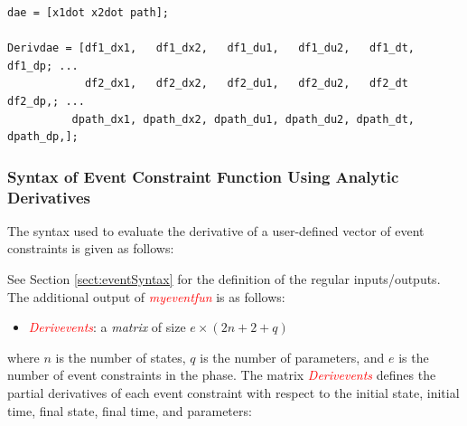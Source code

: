 \documentclass[10pt]{article}
\newenvironment{shadedframe}{%
  \def\FrameCommand{\fcolorbox{black}{shadecolor}}%
  \MakeFramed {\FrameRestore}}
{\endMakeFramed}
\newcommand{\slred}[1]{\textcolor{red}{\sl #1}}
\begin{document}
\begin{shadedframe}
\begin{verbatim}
dae = [x1dot x2dot path];

Derivdae = [df1_dx1,   df1_dx2,   df1_du1,   df1_du2,   df1_dt,   df1_dp; ...
            df2_dx1,   df2_dx2,   df2_du1,   df2_du2,   df2_dt    df2_dp,; ...
          dpath_dx1, dpath_dx2, dpath_du1, dpath_du2, dpath_dt,  dpath_dp,];
\end{verbatim}
\end{shadedframe}
\normalsize

\subsubsection{Syntax of Event Constraint Function Using Analytic Derivatives}

The syntax used to evaluate the derivative of a user-defined vector of event constraints
is given as follows:
\begin{center}
\end{center}
See Section \ref{sect:eventSyntax} for the definition of the regular inputs/outputs.  The additional output of \slred{myeventfun} is as follows:
\begin{itemize}
  \item \slred{Derivevents}: a {\em matrix} of size $e\times (2n+2+q)$
\end{itemize}
where $n$ is the number of states, $q$ is the number of parameters, and $e$ is the number of event constraints in the phase.  The matrix \slred{Derivevents} defines the partial derivatives of each event constraint with respect to the initial state, initial time, final state, final time, and parameters:
\begin{center}
\end{center}
\end{document}
